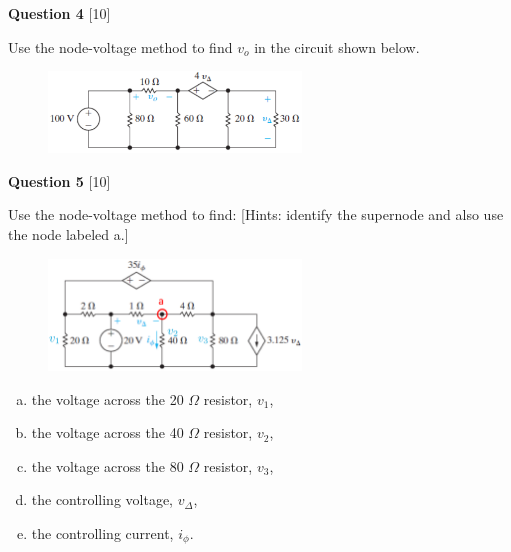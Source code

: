 \documentclass[12pt]{article}
\begin{document}
\newpage
{\bf Question 4} [10] %

Use the node-voltage method to find $v_{o}$ in the circuit shown below.

\begin{figure}[h!]
\begin{center}
 \includegraphics[clip,width=0.6\textwidth]{Fig4-28.png}
\end{center}
\end{figure}

{\bf Question 5} [10] %

Use the node-voltage method to find: [Hints: identify the supernode and also use the node labeled {\color{red} a}.]

\begin{figure}[h!]
\begin{center}
 \includegraphics[clip,width=0.6\textwidth]{Fig4-29.png}
\end{center}
\end{figure}

\begin{enumerate}[(a)]
\item the voltage across the 20 $\Omega$ resistor, $v_{1}$, 
\item the voltage across the 40 $\Omega$ resistor, $v_{2}$, 
\item the voltage across the 80 $\Omega$ resistor, $v_{3}$, 
\item the controlling voltage, $v_{\Delta}$, 
\item the controlling current, $i_{\phi}$. 
\end{enumerate}
 
\end{document}
